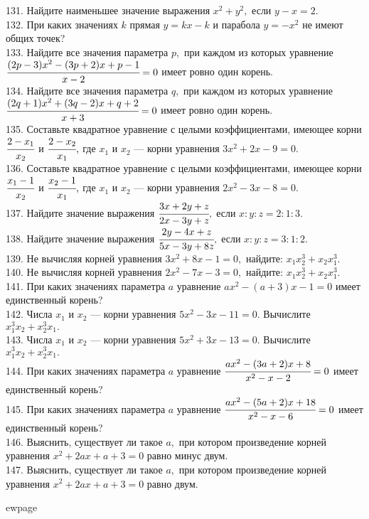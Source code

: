 131. Найдите наименьшее значение выражения $x^2+y^2,$ если $y-x=2.$\\
132. При каких значениях $k$ прямая $y=kx-k$ и парабола $y=-x^2$ не имеют общих точек?\\
133. Найдите все значения параметра $p,$ при каждом из которых уравнение\\ $\cfrac{(2p-3)x^2-(3p+2)x+p-1}{x-2}=0$ имеет ровно один корень.\\
134. Найдите все значения параметра $q,$ при каждом из которых уравнение\\ $\cfrac{(2q+1)x^2+(3q-2)x+q+2}{x+3}=0$ имеет ровно один корень.\\
135. Составьте квадратное уравнение с целыми коэффициентами, имеющее корни $\cfrac{2-x_1}{x_2}$ и $\cfrac{2-x_2}{x_1},$ где $x_1$ и $x_2$ --- корни уравнения $3x^2+2x-9=0.$\\
136. Составьте квадратное уравнение с целыми коэффициентами, имеющее корни $\cfrac{x_1-1}{x_2}$ и $\cfrac{x_2-1}{x_1},$ где $x_1$ и $x_2$ --- корни уравнения $2x^2-3x-8=0.$\\
137. Найдите значение выражения $\cfrac{3x+2y+z}{2x-3y+z},$ если $x:y:z=2:1:3.$\\
138. Найдите значение выражения $\cfrac{2y-4x+z}{5x-3y+8z},$ если $x:y:z=3:1:2.$\\
139. Не вычисляя корней уравнения $3x^2+8x-1=0,$ найдите: $x_1x_2^3+x_2x_1^3.$\\
140. Не вычисляя корней уравнения $2x^2-7x-3=0,$ найдите: $x_1x_2^3+x_2x_1^3.$\\
141. При каких значениях параметра $a$ уравнение $ax^2-(a+3)x-1=0$ имеет единственный корень?\\
142. Числа $x_1$ и $x_2$ --- корни уравнения $5x^2-3x-11=0.$ Вычислите $x_1^3x_2+x_2^3x_1.$\\
143. Числа $x_1$ и $x_2$ --- корни уравнения $5x^2+3x-13=0.$ Вычислите $x_1^3x_2+x_2^3x_1.$\\
144. При каких значениях параметра $a$ уравнение $\cfrac{ax^2-(3a+2)x+8}{x^2-x-2}=0$ имеет единственный корень?\\
145. При каких значениях параметра $a$ уравнение $\cfrac{ax^2-(5a+2)x+18}{x^2-x-6}=0$ имеет единственный корень?\\
146. Выяснить, существует ли такое $a,$ при котором произведение корней уравнения $x^2+2ax+a+3=0$ равно минус двум.\\
147. Выяснить, существует ли такое $a,$ при котором произведение корней уравнения $x^2+2ax+a+3=0$ равно двум.

ewpage
